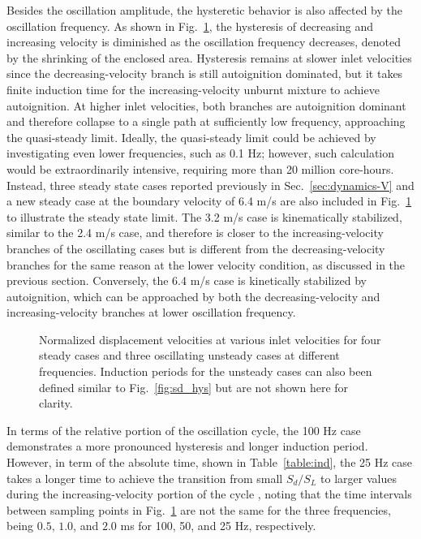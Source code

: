 Besides the oscillation amplitude, the hysteretic behavior is also affected by the oscillation frequency.  As shown in Fig.~\ref{fig:sd_hys_frq}, the hysteresis of decreasing and increasing velocity is diminished as the oscillation frequency decreases, denoted by the shrinking of the enclosed area.  Hysteresis remains at slower inlet velocities since the decreasing-velocity branch is still autoignition dominated, but it takes finite induction time for the increasing-velocity unburnt mixture to achieve autoignition.  At higher inlet velocities, both branches are autoignition dominant and therefore collapse to a single path at sufficiently low frequency, approaching the quasi-steady limit.  Ideally, the quasi-steady limit could be achieved by investigating even lower frequencies, such as 0.1 Hz; however, such calculation would be extraordinarily intensive, requiring more than 20 million core-hours.  Instead, three steady state cases reported previously in Sec.~\ref{sec:dynamics-V} and a new steady case at the boundary velocity of 6.4 m/s are also included in Fig.~\ref{fig:sd_hys_frq} to illustrate the steady state limit.  The 3.2 m/s case is kinematically stabilized, similar to the 2.4 m/s case, and therefore is closer to the increasing-velocity branches of the oscillating cases but is different from the decreasing-velocity branches for the same reason at the lower velocity condition, as discussed in the previous section.  Conversely, the 6.4 m/s case is kinetically stabilized by autoignition, which can be approached by both the decreasing-velocity and increasing-velocity branches at lower oscillation frequency.

\begin{figure}[t]
  \centering
  \scriptsize
  \resizebox{1.0\textwidth}{!}{}
  \normalsize
  \caption{Normalized displacement velocities at various inlet velocities for four steady cases and three oscillating unsteady cases at different frequencies.  Induction periods for the unsteady cases can also been defined similar to Fig.~\ref{fig:sd_hys} but are not shown here for clarity.}
  \label{fig:sd_hys_frq}
\end{figure}

In terms of the relative portion of the oscillation cycle, the 100 Hz case demonstrates a more pronounced hysteresis and longer induction period.  However, in term of the absolute time, shown in Table~\ref{table:ind}, the 25 Hz case takes a longer time to achieve the transition from small $S_d/S_L$ to larger values during the increasing-velocity portion of the cycle , noting that the time intervals between sampling points in Fig.~\ref{fig:sd_hys_frq} are not the same for the three frequencies, being $0.5$, $1.0$, and $2.0$ ms for 100, 50, and 25 Hz, respectively.

